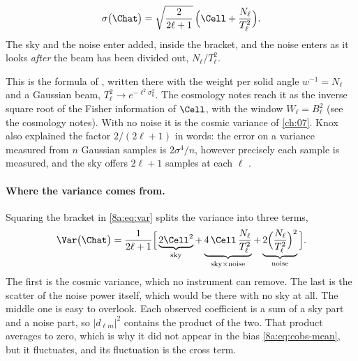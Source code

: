 \begin{keyidea}
\[
  \sigma\bigl(\Chat\bigr)=\sqrt{\frac{2}{2\ell+1}}\,\Bigl(\Cell+\frac{N_\ell}{T_\ell^2}\Bigr).
\]
The sky and the noise enter added, inside the bracket, and the noise enters as it looks
\emph{after} the beam has been divided out, $N_\ell/T_\ell^2$.
\end{keyidea}

This is the formula of \textcite[eq.~4]{Knox1995}, written there with the weight per solid
angle $w^{-1}=N_\ell$ and a Gaussian beam, $T_\ell^2\to e^{-\ell^2\sigma_b^2}$. The cosmology
notes reach it as the inverse square root of the Fisher information of $\Cell$, with the
window $W_\ell=B_\ell^2$ (see the cosmology notes). With no noise it is the cosmic variance of
\cref{ch:07}. Knox also explained the factor $2/(2\ell+1)$ in words: the error on a variance
measured from $n$ Gaussian samples is $2\sigma^4/n$, however precisely each sample is
measured, and the sky offers $2\ell+1$ samples at each $\ell$ .

\paragraph{Where the variance comes from.}
Squaring the bracket in \eqref{8a:eq:var} splits the variance into three terms,
\begin{equation}
  \Var\bigl(\Chat\bigr)=\frac{1}{2\ell+1}\Bigl[\,\underbrace{2\Cell^2}_{\text{sky}}
   +\underbrace{4\,\Cell\,\frac{N_\ell}{T_\ell^2}}_{\text{sky}\times\text{noise}}
   +\underbrace{2\Bigl(\frac{N_\ell}{T_\ell^2}\Bigr)^2}_{\text{noise}}\,\Bigr].
  \label{8a:eq:var-terms}
\end{equation}
The first is the cosmic variance, which no instrument can remove. The last is the scatter of
the noise power itself, which would be there with no sky at all. The middle one is easy to
overlook. Each observed coefficient is a sum of a sky part and a noise part, so
$|d_{\ell m}|^2$ contains the product of the two. That product averages to zero, which is
why it did not appear in the bias \eqref{8a:eq:cobs-mean}, but it fluctuates, and its
fluctuation is the cross term.

